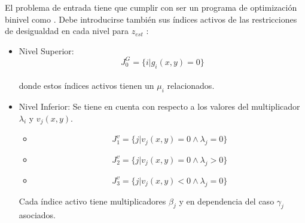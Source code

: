 \begin{samepage}
El problema de entrada tiene que cumplir con ser un programa de optimización binivel como . 
Debe introducirse también sus índices activos de las restricciones de desigualdad en cada nivel para $z_{est}$ :
\begin{itemize}
    \item Nivel Superior:
            \begin{equation}
             J_0^G=\{i | g_i(x,y)=0\}
            \label{J_0_level_superior} %
            \end{equation}\\
    donde estos índices activos tienen un $\mu_i$ relacionados.
        
    \item Nivel Inferior:
                Se tiene en cuenta con respecto a los valores del multiplicador $\lambda_i$ y $v_j(x,y)$.
                
                \begin{itemize}
                    \item \begin{equation}
                        J_1^v=\{j | v_j(x,y)=0 \land \lambda_j=0 \} %
                        \end{equation} 
                    \item \begin{equation}
                        J_2^v=\{j | v_j(x,y)=0 \land \lambda_j>0 \}
                        \label{J_0_lambda_pos_level_inferior}
                    \end{equation}
                    \item \begin{equation}
                        J_3^v=\{j | v_j(x,y)< 0 \land \lambda_j=0 \}
                        \label{J_neg_lambda_0_level_inferior}
                    \end{equation}
                \end{itemize}
    Cada índice activo tiene multiplicadores $\beta_j$ y en dependencia del caso $\gamma_j$ asociados.
\end{itemize}
\end{samepage}

